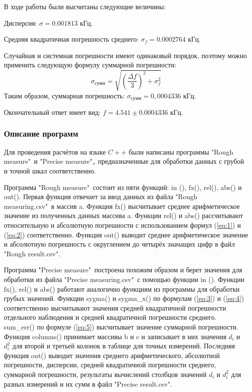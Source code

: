 В ходе работы были высчитаны следующие величины:

Дисперсия: $\sigma=0.001813$ кГц.

Средняя квадратичная погрешность среднего: $\sigma_f=0.0002764$ кГц.

Случайная и системная погрешности имеют одинаковый порядок, поэтому можно применить следующую формулу суммарной погрешности:
\begin{equation}
\label{eq:5}
\sigma_{сумм}=\sqrt{(\frac{\Delta f}{3})^2+\sigma_f^2}
\end{equation}
Таким образом, суммарная погрешность: $\sigma_{сумм}=0,0004336$ кГц.

Окончательный ответ имеет вид: $f=4.541\pm0.0004336$ кГц.

\subsubsection{Описание программ}
Для проведения расчётов на языке $C++$ были написаны программы "Rough measure"\ и "Precise measure"\verb|,| предназначенные для обработки данных с грубой и точной шкал соответственно.

Программа "Rough measure"\ состоит из пяти функций: in (), fx(), rel(), abs() и out(). Первая функция отвечает за ввод данных из файла "Rough measuring.csv"\ в массив a. Функция fx() высчитывает среднее арифметическое значение из полученных данных массива a. Функции rel() и abs() рассчитывают относительную и абсолютную погрешности с использованием формул (\ref{eq:1}) и (\ref{eq:2}) соответственно. Функция out() выводит среднее арифметическое значение и абсолютную погрешность с округлением до четырёх значащих цифр в файл "Rough result.csv".

Программа "Precise measure"\ построена похожим образом и берет значения для обработки из файла "Precise measuring.csv"\ с помощью функции in (). Функции fx(), rel() и abs() работают аналогично функциям из программы для обработки грубых значений. Функции sygma() и sygma\_x() по формулам (\ref{eq:3}) и (\ref{eq:4}) соответственно высчитывают значения средней квадратичной погрешности отдельного наблюдения и средней квадратичной погрешности среднего. sum\_err() по формуле (\ref{eq:5}) высчитывает значение суммарной погрешности. Функция columns() принимает массивы b и c и записывает в них значения $d_i$ и $d_i^2$ для второй и третьей колонок в таблице для точных измерений. Последняя функция out() выводит значения среднего арифметического, абсолютной погрешности, дисперсии, средней квадратичной погрешности среднего, суммарной погрешности, результаты вычислений столбцов значений $d_i$ и $d_i^2$ для разных измерений и их сумм в файл "Precise result.csv".


